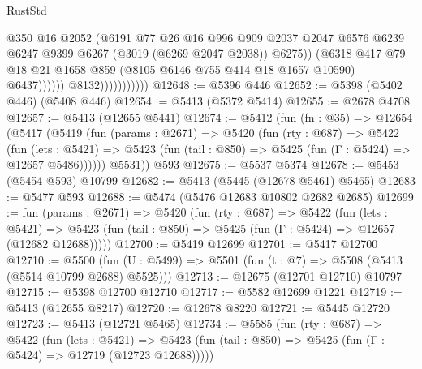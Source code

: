 \begin{lexlean}{RustStd}
\begin{coremodule}
                                      @350
                                      @16
                                      @2052
                                      (@6191
                                        @77
                                        @26
                                        @16
                                        @996
                                        @909
                                        @2037
                                        @2047
                                        @6576
                                        @6239
                                        @6247
                                        @9399
                                        @6267
                                        (@3019 (@6269 @2047 @2038))
                                        @6275))
                                    (@6318
                                      @417
                                      @79
                                      @18
                                      @21
                                      @1658
                                      @859
                                      (@8105 @6146 @755 @414 @18 @1657 @10590)
                                      @6437))))))
                          @8132)))))))))))
@12648 := @5396 @446
@12652 := @5398 (@5402 @446) (@5408 @446)
@12654 := @5413 (@5372 @5414)
@12655 := @2678 @4708
@12657 := @5413 (@12655 @5441)
@12674 := @5412
    (fun (fn : @35) =>
    @12654
      (@5417
        (@5419
          (fun (params : @2671) =>
          @5420
            (fun (rty : @687) =>
            @5422
              (fun (lets : @5421) =>
              @5423 (fun (tail : @850) => @5425 (fun (Γ : @5424) => @12657 @5486))))))
        @5531))
    @593
@12675 := @5537 @5374
@12678 := @5453 (@5454 @593) @10799
@12682 := @5413 (@5445 (@12678 @5461) @5465)
@12683 := @5477 @593
@12688 := @5474 (@5476 @12683 @10802 @2682 @2685)
@12699 := fun (params : @2671) =>
  @5420
    (fun (rty : @687) =>
    @5422
      (fun (lets : @5421) =>
      @5423 (fun (tail : @850) => @5425 (fun (Γ : @5424) => @12657 (@12682 @12688)))))
@12700 := @5419 @12699
@12701 := @5417 @12700
@12710 := @5500
    (fun (U : @5499) => @5501 (fun (t : @7) => @5508 (@5413 (@5514 @10799 @2688) @5525)))
@12713 := @12675 (@12701 @12710) @10797
@12715 := @5398 @12700 @12710
@12717 := @5582 @12699 @1221
@12719 := @5413 (@12655 @8217)
@12720 := @12678 @8220
@12721 := @5445 @12720
@12723 := @5413 (@12721 @5465)
@12734 := @5585
    (fun (rty : @687) =>
    @5422
      (fun (lets : @5421) =>
      @5423 (fun (tail : @850) => @5425 (fun (Γ : @5424) => @12719 (@12723 @12688)))))

\end{coremodule}
\end{lexlean}
